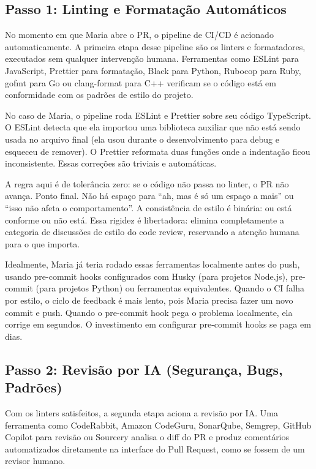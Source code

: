 \subsection{Passo 1: Linting e Formatação Automáticos}

No momento em que Maria abre o PR, o pipeline de CI/CD é acionado automaticamente.
A primeira etapa desse pipeline são os linters e formatadores, executados sem
qualquer intervenção humana. Ferramentas como ESLint para JavaScript, Prettier para
formatação, Black para Python, Rubocop para Ruby, gofmt para Go ou clang-format para
C++ verificam se o código está em conformidade com os padrões de estilo do projeto.

No caso de Maria, o pipeline roda ESLint e Prettier sobre seu código TypeScript. O
ESLint detecta que ela importou uma biblioteca auxiliar que não está sendo usada no
arquivo final (ela usou durante o desenvolvimento para debug e esqueceu de remover).
O Prettier reformata duas funções onde a indentação ficou inconsistente. Essas
correções são triviais e automáticas.

A regra aqui é de tolerância zero: se o código não passa no linter, o PR não avança.
Ponto final. Não há espaço para ``ah, mas é só um espaço a mais'' ou ``isso não
afeta o comportamento''. A consistência de estilo é binária: ou está conforme ou
não está. Essa rigidez é libertadora: elimina completamente a categoria de
discussões de estilo do code review, reservando a atenção humana para o que importa.

Idealmente, Maria já teria rodado essas ferramentas localmente antes do push,
usando pre-commit hooks configurados com Husky (para projetos Node.js), pre-commit
(para projetos Python) ou ferramentas equivalentes. Quando o CI falha por estilo, o
ciclo de feedback é mais lento, pois Maria precisa fazer um novo commit e push. Quando
o pre-commit hook pega o problema localmente, ela corrige em segundos. O investimento
em configurar pre-commit hooks se paga em dias.

\subsection{Passo 2: Revisão por IA (Segurança, Bugs, Padrões)}

Com os linters satisfeitos, a segunda etapa aciona a revisão por IA. Uma ferramenta
como CodeRabbit, Amazon CodeGuru, SonarQube, Semgrep, GitHub Copilot para revisão
ou Sourcery analisa o diff do PR e produz comentários automatizados diretamente na
interface do Pull Request, como se fossem de um revisor humano.

